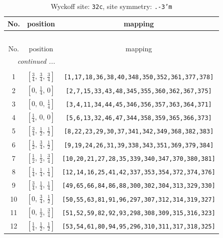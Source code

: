 \documentclass[fleqn,8pt]{jsarticle}
\begin{document}
\begin{longtable}{ccc}
\caption{Wyckoff site: {\tt 32c}, site symmetry: {\tt .-3'm}}
 \\
 \hline \hline
No. & position & mapping \\ \hline \endfirsthead

\multicolumn{2}{l}{\tablename\ \thetable{}} \\
 \hline \hline
No. & position & mapping \\ \hline \endhead

 \hline \hline
\multicolumn{2}{r}{\footnotesize\it continued ...} \\ \endfoot

 \hline \hline
\multicolumn{2}{r}{} \\ \endlastfoot

1 & $\left[ \frac{3}{4},\, \frac{3}{4},\, \frac{3}{4} \right]$ & {\tt [1,17,18,36,38,40,348,350,352,361,377,378]} \\ \hline
2 & $\left[ 0,\, \frac{1}{4},\, 0 \right]$ & {\tt [2,7,15,33,43,48,345,355,360,362,367,375]} \\ \hline
3 & $\left[ 0,\, 0,\, \frac{1}{4} \right]$ & {\tt [3,4,11,34,44,45,346,356,357,363,364,371]} \\ \hline
4 & $\left[ \frac{1}{4},\, 0,\, 0 \right]$ & {\tt [5,6,13,32,46,47,344,358,359,365,366,373]} \\ \hline
5 & $\left[ \frac{3}{4},\, \frac{1}{2},\, \frac{1}{2} \right]$ & {\tt [8,22,23,29,30,37,341,342,349,368,382,383]} \\ \hline
6 & $\left[ \frac{1}{2},\, \frac{3}{4},\, \frac{1}{2} \right]$ & {\tt [9,19,24,26,31,39,338,343,351,369,379,384]} \\ \hline
7 & $\left[ \frac{1}{2},\, \frac{1}{2},\, \frac{3}{4} \right]$ & {\tt [10,20,21,27,28,35,339,340,347,370,380,381]} \\ \hline
8 & $\left[ \frac{1}{4},\, \frac{1}{4},\, \frac{1}{4} \right]$ & {\tt [12,14,16,25,41,42,337,353,354,372,374,376]} \\ \hline
9 & $\left[ \frac{3}{4},\, \frac{1}{4},\, \frac{1}{4} \right]$ & {\tt [49,65,66,84,86,88,300,302,304,313,329,330]} \\ \hline
10 & $\left[ 0,\, \frac{3}{4},\, \frac{1}{2} \right]$ & {\tt [50,55,63,81,91,96,297,307,312,314,319,327]} \\ \hline
11 & $\left[ 0,\, \frac{1}{2},\, \frac{3}{4} \right]$ & {\tt [51,52,59,82,92,93,298,308,309,315,316,323]} \\ \hline
12 & $\left[ \frac{1}{4},\, \frac{1}{2},\, \frac{1}{2} \right]$ & {\tt [53,54,61,80,94,95,296,310,311,317,318,325]} \\ \hline

\end{longtable}
\end{document}
